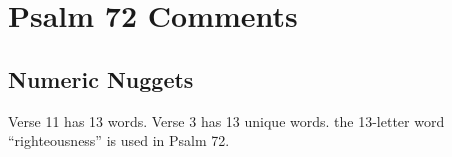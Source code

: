 \section{Psalm 72 Comments}

\subsection{Numeric Nuggets}
Verse 11 has 13 words. Verse 3 has 13 unique words. the 13-letter word ``righteousness'' is used in Psalm 72.